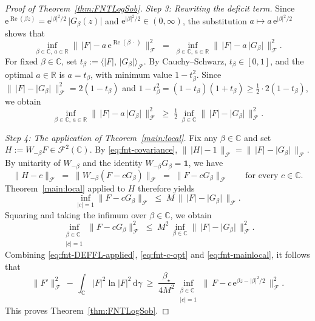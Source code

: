 \documentclass[11pt]{amsart}
\theoremstyle{remark}
\newcommand{\C}{\mathbb{C}}
\newcommand{\abs}[1]{\lvert #1 \rvert}
\newcommand{\norm}[1]{\lVert #1 \rVert}
\newcommand{\dd}{\mathrm{d}}
\newcommand{\ee}{\mathrm{e}}
\begin{document}
\begin{proof}[Proof of Theorem~\ref{thm:FNTLogSob}]
\noindent
\emph{Step 3: Rewriting the deficit term.}\;
Since $\ee^{\operatorname{Re}(\beta z)}
= \ee^{\abs{\beta}^2/2}\, \abs{G_\beta(z)}$ and
$\ee^{\abs{\beta}^2/2} \in (0, \infty)$, the substitution
$a \mapsto a\, \ee^{\abs{\beta}^2/2}$ shows that
\[
\inf_{\beta \in \C,\, a \in \mathbb{R}}
\norm{\, \abs{F} - a\, \ee^{\operatorname{Re}(\beta\,\cdot\,)} \,}_{\mathcal{F}}^2
\;=\;
\inf_{\beta \in \C,\, a \in \mathbb{R}}
\norm{\, \abs{F} - a\, \abs{G_\beta} \,}_{\mathcal{F}}^2.
\]
For fixed $\beta \in \C$, set $t_\beta := \langle \abs{F},\, \abs{G_\beta} \rangle_{\mathcal{F}}$.
By Cauchy--Schwarz, $t_\beta \in [0, 1]$, and the optimal $a \in \mathbb{R}$ is
$a = t_\beta$, with minimum value $1 - t_\beta^2$.  Since
$\norm{\, \abs{F} - \abs{G_\beta} \,}_{\mathcal{F}}^2 = 2(1 - t_\beta)$
and
$1 - t_\beta^2 = (1 - t_\beta)(1 + t_\beta) \ge \tfrac{1}{2}\cdot 2(1 - t_\beta)$,
we obtain
\begin{equation}\label{eq:fnt-c-opt}
\inf_{\beta \in \C,\, a \in \mathbb{R}}
\norm{\, \abs{F} - a\, \abs{G_\beta} \,}_{\mathcal{F}}^2
\;\ge\;
\tfrac{1}{2}\, \inf_{\beta \in \C}
\norm{\, \abs{F} - \abs{G_\beta} \,}_{\mathcal{F}}^2.
\end{equation}


\noindent
\emph{Step 4: The application of Theorem~\ref{main:local}.}\;
Fix any $\beta \in \C$ and set $H := W_{-\beta} F \in \mathcal{F}^2(\C)$.
By \eqref{eq:fnt-covariance},
$\norm{\, \abs{H} - 1 \,}_{\mathcal{F}}
= \norm{\, \abs{F} - \abs{G_\beta} \,}_{\mathcal{F}}$.
By unitarity of $W_{-\beta}$ and the identity $W_{-\beta} G_\beta = \mathbf{1}$, we have
\[
\norm{H - c}_{\mathcal{F}}
\;=\; \norm{W_{-\beta}(F - c G_\beta)}_{\mathcal{F}}
\;=\; \norm{F - c G_\beta}_{\mathcal{F}}
\qquad \text{for every } c \in \C.
\]
Theorem~\ref{main:local} applied to $H$ therefore yields
\[
\inf_{\abs{c}=1} \norm{F - c G_\beta}_{\mathcal{F}}
\;\le\; M\, \norm{\, \abs{F} - \abs{G_\beta} \,}_{\mathcal{F}}.
\]
Squaring and taking the infimum over $\beta \in \C$, we obtain
\begin{equation}\label{eq:fnt-mainlocal}
\inf_{\substack{\beta \in \C \\ \abs{c}=1}}
\norm{F - c G_\beta}_{\mathcal{F}}^2
\;\le\;
M^2\, \inf_{\beta \in \C}
\norm{\, \abs{F} - \abs{G_\beta} \,}_{\mathcal{F}}^2.
\end{equation}
Combining \eqref{eq:fnt-DEFFL-applied}, \eqref{eq:fnt-c-opt} and
\eqref{eq:fnt-mainlocal}, it follows that
\[
\norm{F'}_{\mathcal{F}}^2
\,-\, \int_{\C} \abs{F}^2 \ln \abs{F}^2\, \dd\gamma
\;\ge\;
\frac{\beta_\star}{4 M^2}
\inf_{\substack{\beta \in \C \\ \abs{c}=1}}
\norm{\, F - c\, \ee^{\beta z - \abs{\beta}^2/2} \,}_{\mathcal{F}}^2.
\]
This proves Theorem~\ref{thm:FNTLogSob}.
\end{proof}
\end{document}
